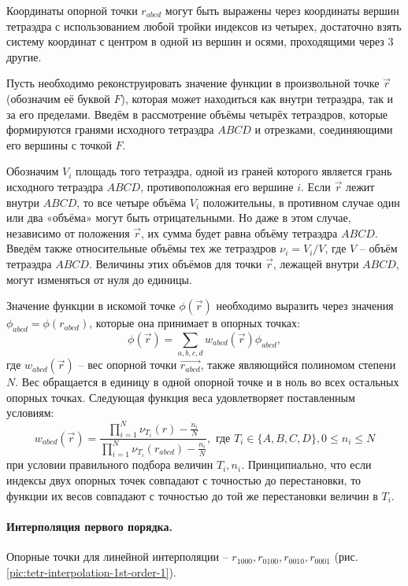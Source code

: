 Координаты опорной точки $r_{abcd}$ могут быть выражены через координаты вершин тетраэдра с использованием любой тройки индексов из четырех, достаточно взять систему координат с центром в одной из вершин и осями, проходящими через 3 другие.

Пусть необходимо реконструировать значение функции в произвольной точке $\vec{r}$ (обозначим её буквой $F$), которая может находиться как внутри тетраэдра, так и за его пределами. Введём в рассмотрение объёмы четырёх тетраэдров, которые формируются гранями исходного тетраэдра $ABCD$ и отрезками, соединяющими его вершины с точкой $F$.

Обозначим $V_i$ площадь того тетраэдра, одной из граней которого является грань исходного тетраэдра $ABCD$, противоположная его вершине $i$. Если $\vec{r}$ лежит внутри $ABCD$, то все четыре объёма $V_i$ положительны, в противном случае один или два «объёма» могут быть отрицательными. Но даже в этом случае, независимо от положения $\vec{r}$, их сумма будет равна объёму тетраэдра $ABCD$. Введём также относительные объёмы тех же тетраэдров $\nu_i = V_i / V$, где $V$ -- объём тетраэдра $ABCD$. Величины этих объёмов для точки $\vec{r}$, лежащей внутри $ABCD$, могут изменяться от нуля до единицы.

Значение функции в искомой точке $\phi(\vec{r})$ необходимо выразить через значения $\phi_{abcd} = \phi(r_{abcd})$, которые она принимает в опорных точках:
\begin{equation}
\phi(\vec{r}) = \sum_{a,b,c,d}{w_{abcd}(\vec{r}) \phi_{abcd}},
\end{equation}
где $w_{abcd}(\vec{r})$ -- вес опорной точки $\vec{r_{abcd}}$, также являющийся полиномом степени $N$. Вес обращается в единицу в одной опорной точке и в ноль во всех остальных опорных точках. Следующая функция веса удовлетворяет поставленным условиям:
\begin{equation}
w_{abcd}(\vec{r}) = \frac{ \prod_{i=1}^N{\nu_{T_i}(r) - \frac{n_i}{N}} }{ \prod_{i=1}^N{\nu_{T_i}(r_{abcd}) - \frac{n_i}{N}} }, \textrm{ где } T_i \in \{A, B, C, D\}, 0 \le n_i \le N
\end{equation}
при условии правильного подбора величин ${T_i}, {n_i}$. Принципиально, что если индексы двух опорных точек совпадают с точностью до перестановки, то функции их весов совпадают с точностью до той же перестановки величин в ${T_i}$.

\paragraph{Интерполяция первого порядка.} Опорные точки для линейной интерполяции -- $r_{1000}, r_{0100}, r_{0010}, r_{0001}$ (рис. \ref{pic:tetr-interpolation-1st-order-1}).


